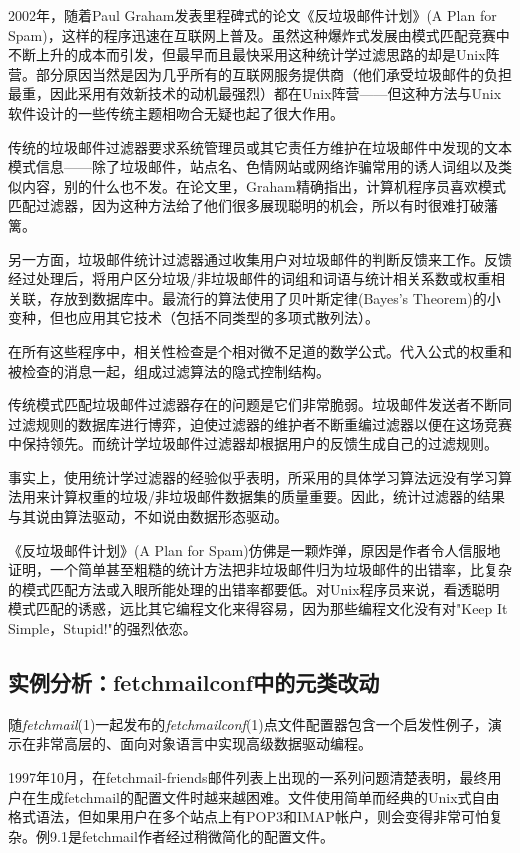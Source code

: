 \documentclass[12pt,oneside]{book}
\begin{document}
\begin{common-format}
2002年，随着Paul Graham发表里程碑式的论文《反垃圾邮件计划》(A Plan for Spam)\cite{Graham}，这样的程序迅速在互联网上普及。虽然这种爆炸式发展由模式匹配竞赛中不断上升的成本而引发，但最早而且最快采用这种统计学过滤思路的却是Unix阵营。部分原因当然是因为几乎所有的互联网服务提供商（他们承受垃圾邮件的负担最重，因此采用有效新技术的动机最强烈）都在Unix阵营——但这种方法与Unix软件设计的一些传统主题相吻合无疑也起了很大作用。

传统的垃圾邮件过滤器要求系统管理员或其它责任方维护在垃圾邮件中发现的文本模式信息——除了垃圾邮件，站点名、色情网站或网络诈骗常用的诱人词组以及类似内容，别的什么也不发。在论文里，Graham精确指出，计算机程序员喜欢模式匹配过滤器，因为这种方法给了他们很多展现聪明的机会，所以有时很难打破藩篱。

另一方面，垃圾邮件统计过滤器通过收集用户对垃圾邮件的判断反馈来工作。反馈经过处理后，将用户区分垃圾/非垃圾邮件的词组和词语与统计相关系数或权重相关联，存放到数据库中。最流行的算法使用了贝叶斯定律(Bayes's Theorem)的小变种，但也应用其它技术（包括不同类型的多项式散列法）。

在所有这些程序中，相关性检查是个相对微不足道的数学公式。代入公式的权重和被检查的消息一起，组成过滤算法的隐式控制结构。

传统模式匹配垃圾邮件过滤器存在的问题是它们非常脆弱。垃圾邮件发送者不断同过滤规则的数据库进行博弈，迫使过滤器的维护者不断重编过滤器以便在这场竞赛中保持领先。而统计学垃圾邮件过滤器却根据用户的反馈生成自己的过滤规则。

事实上，使用统计学过滤器的经验似乎表明，所采用的具体学习算法远没有学习算法用来计算权重的垃圾/非垃圾邮件数据集的质量重要。因此，统计过滤器的结果与其说由算法驱动，不如说由数据形态驱动。

《反垃圾邮件计划》(A Plan for Spam)仿佛是一颗炸弹，原因是作者令人信服地证明，一个简单甚至粗糙的统计方法把非垃圾邮件归为垃圾邮件的出错率，比复杂的模式匹配方法或入眼所能处理的出错率都要低。对Unix程序员来说，看透聪明模式匹配的诱惑，远比其它编程文化来得容易，因为那些编程文化没有对"Keep It Simple，Stupid!"的强烈依恋。

\subsection{实例分析：fetchmailconf中的元类改动}
随\textit{fetchmail}(1)一起发布的\textit{fetchmailconf}(1)点文件配置器包含一个启发性例子，演示在非常高层的、面向对象语言中实现高级数据驱动编程。

1997年10月，在fetchmail-friends邮件列表上出现的一系列问题清楚表明，最终用户在生成fetchmail的配置文件时越来越困难。文件使用简单而经典的Unix式自由格式语法，但如果用户在多个站点上有POP3和IMAP帐户，则会变得非常可怕复杂。例9.1是fetchmail作者经过稍微简化的配置文件。




\end{common-format}
\end{document}

